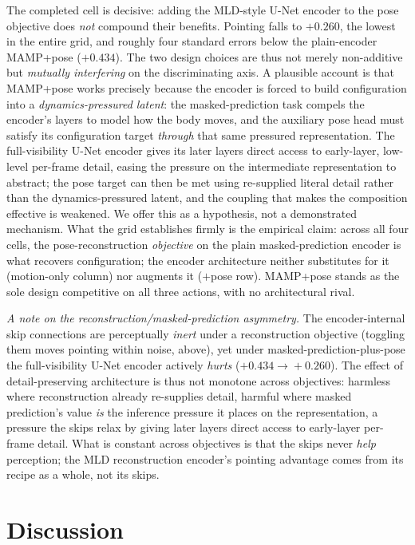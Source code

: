 \documentclass[letterpaper]{article} %
\begin{document}
The completed cell is decisive: adding the MLD-style U-Net encoder to the pose objective does
\emph{not} compound their benefits. Pointing falls to $+0.260$, the lowest in the entire
grid, and roughly four standard errors below the plain-encoder MAMP+pose ($+0.434$). The two
design choices are thus not merely non-additive but \emph{mutually interfering} on the
discriminating axis. A plausible account is that MAMP+pose works precisely because the encoder is
forced to build configuration into a \emph{dynamics-pressured latent}: the masked-prediction task
compels the encoder's layers to model how the body moves, and the auxiliary pose head must satisfy
its configuration target \emph{through} that same pressured representation. The full-visibility
U-Net encoder gives its later layers direct access to early-layer, low-level per-frame detail,
easing the pressure on the intermediate representation to abstract; the pose target can then be met
using re-supplied literal detail rather than the dynamics-pressured latent, and the coupling that
makes the composition effective is weakened. We offer this as a hypothesis, not a demonstrated
mechanism. What the grid establishes firmly is the empirical claim: across all four cells, the
pose-reconstruction \emph{objective} on the plain masked-prediction encoder is what recovers
configuration; the encoder architecture neither substitutes for it (motion-only column) nor
augments it ($+$pose row). MAMP+pose stands as the sole design competitive on all three actions,
with no architectural rival.

\emph{A note on the reconstruction/masked-prediction asymmetry.} The encoder-internal skip
connections are perceptually \emph{inert} under a reconstruction objective (toggling them moves
pointing within noise, above), yet under masked-prediction-plus-pose the full-visibility U-Net
encoder actively \emph{hurts} ($+0.434\!\to\!+0.260$). The effect of detail-preserving architecture
is thus not monotone across objectives: harmless where reconstruction already re-supplies detail,
harmful where masked prediction's value \emph{is} the inference pressure it places on the
representation, a pressure the skips relax by giving later layers direct access to early-layer
per-frame detail. What is constant across objectives is that the skips never \emph{help} perception;
the MLD reconstruction encoder's pointing advantage comes from its recipe as a whole, not its skips.

\section{Discussion}
\end{document}
